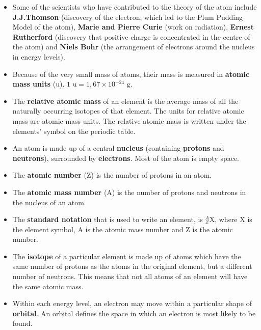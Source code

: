     \label{m38741*cid10}
            \nopagebreak
      \label{m38741*id262657}\begin{itemize}[noitemsep]
\item Some of the scientists who have contributed to the theory of the atom include \textbf{J.J.Thomson} (discovery of the electron, which led to the Plum Pudding Model of the atom), \textbf{Marie and Pierre Curie} (work on radiation), \textbf{Ernest Rutherford} (discovery that positive charge is concentrated in the centre of the atom) and \textbf{Niels Bohr} (the arrangement of electrons around the nucleus in energy levels).
\label{m38741*uid171}\item Because of the very small mass of atoms, their mass is measured in \textbf{atomic mass units} (u). $1 \text{ u} = 1,67 \times 10{}^{-24}\text{ g}$.
\item The \textbf{relative atomic mass} of an element is the average mass of all the naturally occurring isotopes of that element. The units for relative atomic mass are atomic mass units. The relative atomic mass is written under the elements' symbol on the periodic table.
\label{m38741*uid172}\item An atom is made up of a central \textbf{nucleus} (containing \textbf{protons} and \textbf{neutrons}), surrounded by \textbf{electrons}. Most of the atom is empty space.
\label{m38741*uid173}\item The \textbf{atomic number} (Z) is the number of protons in an atom.
\label{m38741*uid174}\item The \textbf{atomic mass number} (A) is the number of protons and neutrons in the nucleus of an atom.
\label{m38741*uid175}\item The \textbf{standard notation} that is used to write an element, is $_{Z}^{A}\text{X}$, where X is the element symbol, A is the atomic mass number and Z is the atomic number.
\label{m38741*uid176}\item The \textbf{isotope} of a particular element is made up of atoms which have the same number of protons as the atoms in the original element, but a different number of neutrons. This means that not all atoms of an element will have the same atomic mass.
\label{m38741*uid179}\item Within each energy level, an electron may move within a particular shape of \textbf{orbital}. An orbital defines the space in which an electron is most likely to be found. 

\end{itemize}
